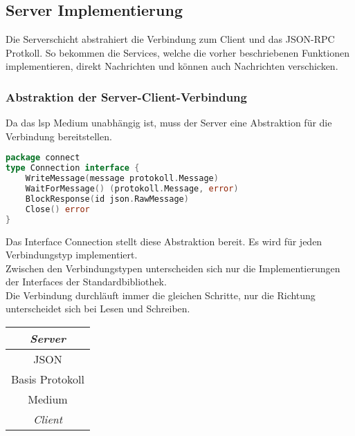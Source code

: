 \documentclass[./einleitung.tex]{subfiles}
\begin{document}
    \subsection{Server Implementierung}\label{subsec:server-implementierung}
    Die Serverschicht abstrahiert die Verbindung zum Client und das JSON-RPC Protkoll.
    So bekommen die Services, welche die vorher beschriebenen Funktionen implementieren, direkt Nachrichten und können auch Nachrichten verschicken.
    \subsubsection{Abstraktion der Server-Client-Verbindung}
    Da das \acrshort{lsp} Medium unabhängig ist, muss der Server eine Abstraktion für die Verbindung bereitstellen.
    \begin{lstlisting}[language=Go]
package connect
type Connection interface {
	WriteMessage(message protokoll.Message)
	WaitForMessage() (protokoll.Message, error)
	BlockResponse(id json.RawMessage)
	Close() error
}
    \end{lstlisting}
    Das Interface Connection stellt diese Abstraktion bereit.
    Es wird für jeden Verbindungstyp implementiert.\\
    Zwischen den Verbindungstypen unterscheiden sich nur die Implementierungen der Interfaces der Standardbibliothek.\\
    Die Verbindung durchläuft immer die gleichen Schritte, nur die Richtung unterscheidet sich bei Lesen und Schreiben.
    \begin{center}
        \begin{center}
            \left\downarrow
            \left\uparrow
            \left\vspace{1cm}
            \begin{tabular}{|c|}
                \hline
                \textit{Server}\\
                \hline
                JSON\\
                \hline
                Basis Protokoll\\
                \hline
                Medium\\
                \hline
                \textit{Client}\\
                \hline
            \end{tabular}
        \end{center}
    \end{center}
\end{document}
